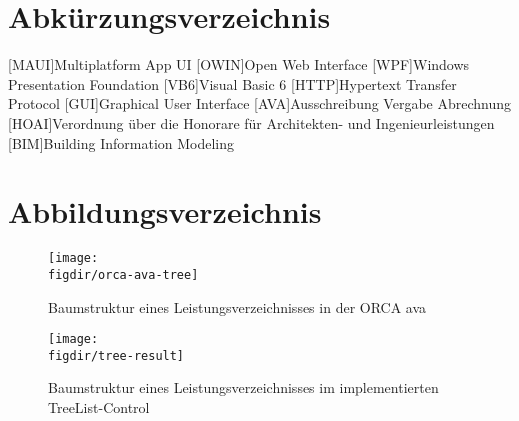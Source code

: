 \chapter{Abkürzungsverzeichnis}

\begin{acronym}
	[MAUI]{Multiplatform App UI}
	[OWIN]{Open Web Interface}
	[WPF]{Windows Presentation Foundation}
	[VB6]{Visual Basic 6}
	[HTTP]{Hypertext Transfer Protocol}
	[GUI]{Graphical User Interface}
	[AVA]{Ausschreibung Vergabe Abrechnung}
	[HOAI]{Verordnung über die Honorare für Architekten- und Ingenieurleistungen}
	[BIM]{Building Information Modeling}
\end{acronym}

\clearpage

\chapter{Abbildungsverzeichnis}

\begin{figure}[H]
	\centering
	{\caption{Baumstruktur eines Leistungsverzeichnisses in der ORCA \ac{ava}}
		\label{fig:LV-der-AVA}}
	{\texttt{[image: \\figdir/orca-ava-tree]}}
\end{figure}

\begin{figure}[H]
	\centering
	{\caption{Baumstruktur eines Leistungsverzeichnisses im implementierten TreeList-Control}
		\label{fig:tree-result}}
	{\texttt{[image: \\figdir/tree-result]}}
\end{figure}


